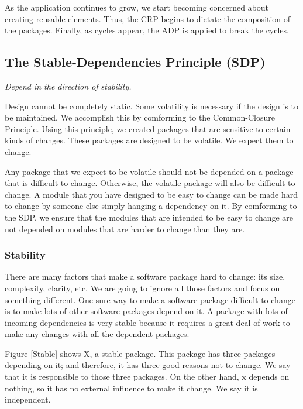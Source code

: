 \documentclass[12pt]{report}
\newcommand\tab[1][1cm]{\hspace*{#1}}
\begin{document}
As the application continues to grow, 
we start becoming concerned about creating reusable elements. 
Thus, the CRP begins to dictate the composition of the packages. 
Finally, as cycles appear, the ADP is applied to break the cycles.

\subsection{The Stable-Dependencies Principle (SDP)}

\tab \textit{Depend in the direction of stability.}

Design cannot be completely static. Some volatility is necessary if the
design is to be maintained. We accomplish this by comforming to the 
Common-Closure Principle. Using this principle, we created packages that are
sensitive to certain kinds of changes. These packages are designed to be
volatile. We expect them to change. 

Any package that we expect to be volatile 
should not be depended on a package 
that is difficult to change. Otherwise, the volatile package will also be 
difficult to change. A module that you have designed to be easy to change 
can be made hard to change by someone else simply hanging a dependency 
on it. By comforming to the SDP, we ensure that the modules that are 
intended to be easy to change are not depended on modules that are harder 
to change than they are. 

\subsubsection{Stability}

There are many factors that make a software package hard 
to change: its size, complexity, clarity, etc. 
We are going to ignore all those factors and focus on something different. 
One sure way to make a software package difficult to change is to 
make lots of other software packages depend on it. 
A package with  lots of incoming dependencies is very stable because 
it requires a great deal of work to make any changes with all the dependent
packages.

Figure \ref{Stable} shows X, a stable package. This package has three 
packages depending on it; and therefore, it has three good reasons 
not to change. We say that it is responsible to those three packages. 
On the other hand, x depends on nothing, 
so it has no external influence to make it change. 
We say it is independent.
\end{document}
